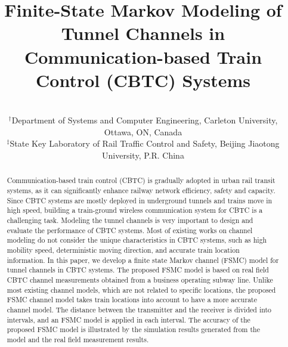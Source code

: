 \documentclass[conference]{IEEEtran}
\begin{document}
\title{Finite-State Markov Modeling of Tunnel Channels in Communication-based Train Control (CBTC) Systems}

\author{
\\
$^{\dag}$Department of Systems and Computer Engineering, Carleton University, Ottawa, ON, Canada\\
$^{\ddag}$State Key Laboratory of Rail Traffic Control and Safety, Beijing Jiaotong University, P.R. China


}




\maketitle

\begin{abstract}
Communication-based train control (CBTC) is gradually adopted in urban rail transit systems, as it can significantly enhance railway network efficiency, safety and capacity. Since CBTC systems are mostly deployed in underground tunnels and trains move in high speed, building a train-ground wireless communication system for CBTC is a challenging task. Modeling the tunnel channels is very important to design and evaluate the performance of CBTC systems. Most of existing works on channel modeling do not consider the unique characteristics in CBTC systems, such as high mobility speed, deterministic moving direction, and accurate train location information. In this paper, we develop a finite state Markov channel (FSMC) model for tunnel channels in CBTC systems. The proposed FSMC model is based on real field CBTC channel measurements obtained from a business operating subway line. Unlike most existing channel models, which are not related to specific locations, the proposed FSMC channel model takes train locations into account to have a more accurate channel model. The distance between the transmitter and the receiver is  divided into intervals, and an FSMC model is applied in each interval. The accuracy of the proposed FSMC model is illustrated by the simulation results generated from the model and the real field measurement results.
\end{abstract}








\IEEEpeerreviewmaketitle
\end{document}
